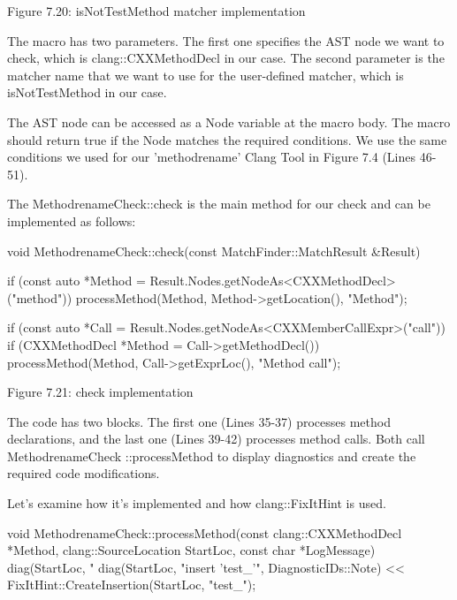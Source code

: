 \begin{center}
Figure 7.20: isNotTestMethod matcher implementation
\end{center}

The macro has two parameters. The first one specifies the AST node we want to check, which is clang::CXXMethodDecl in our case. The second parameter is the matcher name that we want to use for the user-defined matcher, which is isNotTestMethod in our case.

The AST node can be accessed as a Node variable at the macro body. The macro should return true if the Node matches the required conditions. We use the same conditions we used for our 'methodrename' Clang Tool in Figure 7.4 (Lines 46-51).

The MethodrenameCheck::check is the main method for our check and can be implemented as follows:

\begin{cpp}
void MethodrenameCheck::check(const MatchFinder::MatchResult &Result) {
  if (const auto *Method = Result.Nodes.getNodeAs<CXXMethodDecl>("method")) {
    processMethod(Method, Method->getLocation(), "Method");
  }

  if (const auto *Call = Result.Nodes.getNodeAs<CXXMemberCallExpr>("call")) {
    if (CXXMethodDecl *Method = Call->getMethodDecl()) {
      processMethod(Method, Call->getExprLoc(), "Method call");
    }
  }
}
\end{cpp}

\begin{center}
Figure 7.21: check implementation
\end{center}

The code has two blocks. The first one (Lines 35-37) processes method declarations, and the last one (Lines 39-42) processes method calls. Both call MethodrenameCheck ::processMethod to display diagnostics and create the required code modifications.

Let's examine how it's implemented and how clang::FixItHint is used.

\begin{cpp}
void MethodrenameCheck::processMethod(const clang::CXXMethodDecl *Method,
                                      clang::SourceLocation StartLoc,
                                      const char *LogMessage) {
  diag(StartLoc, "%
  diag(StartLoc, "insert 'test_'", DiagnosticIDs::Note)
    << FixItHint::CreateInsertion(StartLoc, "test_");
}
\end{cpp}

